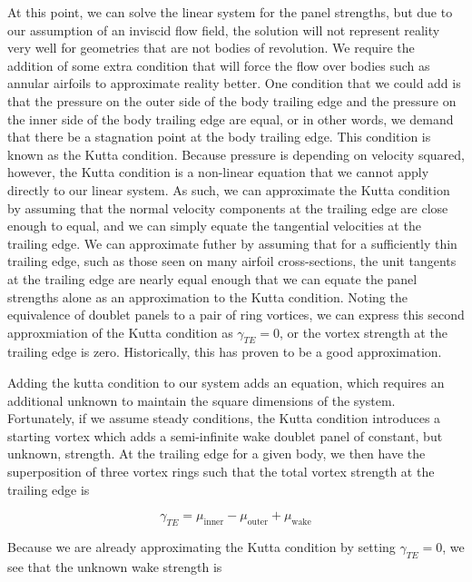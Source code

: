 At this point, we can solve the linear system for the panel strengths,
but due to our assumption of an inviscid flow field, the solution will not represent reality very well for geometries that are not bodies of revolution.
We require the addition of some extra condition that will force the flow over bodies such as annular airfoils to approximate reality better.
One condition that we could add is that the pressure on the outer side of the body trailing edge and the pressure on the inner side of the body trailing edge are equal,
or in other words, we demand that there be a stagnation point at the body trailing edge.
This condition is known as the Kutta condition.
Because pressure is depending on velocity squared, however, the Kutta condition is a non-linear equation that we cannot apply directly to our linear system.
As such, we can approximate the Kutta condition by assuming that the normal velocity components at the trailing edge are close enough to equal, and we can simply equate the tangential velocities at the trailing edge.
We can approximate futher by assuming that for a sufficiently thin trailing edge, such as those seen on many airfoil cross-sections, the unit tangents at the trailing edge are nearly equal enough that we can equate the panel strengths alone as an approximation to the Kutta condition.
Noting the equivalence of doublet panels to a pair of ring vortices, we can express this second approxmiation of the Kutta condition as \(\gamma_{TE} = 0\), or the vortex strength at the trailing edge is zero.
Historically, this has proven to be a good approximation.

Adding the kutta condition to our system adds an equation, which requires an additional unknown to maintain the square dimensions of the system.
Fortunately, if we assume steady conditions, the Kutta condition introduces a starting vortex which adds a semi-infinite wake doublet panel of constant, but unknown, strength.
At the trailing edge for a given body, we then have the superposition of three vortex rings such that the total vortex strength at the trailing edge is

\begin{equation}
    \gamma_{TE} = \mu_\text{inner} - \mu_\text{outer} + \mu_\text{wake}
\end{equation}

\noindent Because we are already approximating the Kutta condition by setting \(\gamma_{TE}=0\), we see that the unknown wake strength is

